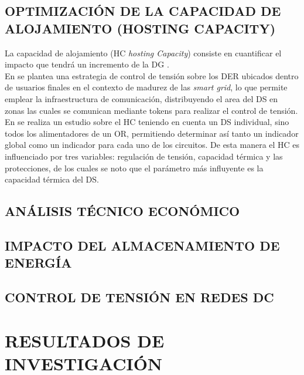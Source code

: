 \documentclass[12pt, letterpaper]{report}
\begin{document}
\section{OPTIMIZACIÓN DE LA CAPACIDAD DE ALOJAMIENTO (HOSTING CAPACITY)}	
La capacidad de alojamiento (HC \textit{hosting Capacity}) consiste en cuantificar el impacto que tendrá un incremento de la DG \cite{Bollen2008}.\\
En \cite{Caldon2015a} se plantea una estrategia de control de tensión sobre los DER ubicados dentro  de usuarios finales en el contexto de madurez de las \textit{smart grid}, lo que permite emplear la infraestructura de comunicación, distribuyendo el area del \ac{DS} en zonas las cuales se comunican mediante tokens para realizar el control de tensión.\\
En \cite{Rylander2016a} se realiza un estudio sobre el HC teniendo en cuenta un \ac{DS} individual,  sino todos los alimentadores de un OR, permitiendo determinar  así tanto un indicador global como un indicador para cada uno de los circuitos.  De esta manera el HC es influenciado por tres variables: regulación de tensión, capacidad térmica  y las protecciones, de los cuales se noto que el parámetro más influyente es la capacidad térmica del \ac{DS}.

\section{ANÁLISIS TÉCNICO ECONÓMICO}

\section{IMPACTO DEL ALMACENAMIENTO DE ENERGÍA}
\section{CONTROL DE TENSIÓN EN REDES DC}
\chapter{RESULTADOS DE INVESTIGACIÓN}

\label{cap:resultados}



%
\end{document}
